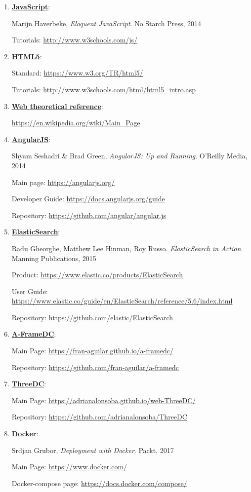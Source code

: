 \documentclass[a4paper, 12pt]{book}
\begin{document}
\begin{enumerate}
\item \underline{\textbf{JavaScript}}:

 Marijn Haverbeke, \textit{Eloquent JavaScript}. No Starch Press, 2014

Tutorials: \url{http://www.w3schools.com/js/}

\item \underline{\textbf{HTML5}}:

Standard: \url{https://www.w3.org/TR/html5/}

Tutorials: \url{http://www.w3schools.com/html/html5_intro.asp}

\item \underline{\textbf{Web theoretical reference}}: 

\url{https://en.wikipedia.org/wiki/Main_Page}

\item \underline{\textbf{AngularJS}}:

 Shyam Seshadri & Brad Green, \textit{AngularJS: Up and Running}. O'Reilly Media, 2014

Main page: \url{https://angularjs.org/}

Developer Guide: \url{https://docs.angularjs.org/guide}

Repository: \url{https://github.com/angular/angular.js}

\item \underline{\textbf{ElasticSearch}}: 

 Radu Gheorghe, Matthew Lee Hinman, Roy Russo. \textit{ElasticSearch in Action}. Manning Publications, 2015

Product: \url{https://www.elastic.co/products/ElasticSearch}

User Guide: \url{https://www.elastic.co/guide/en/ElasticSearch/reference/5.6/index.html}

Repository: \url{https://github.com/elastic/ElasticSearch}

\item \underline{\textbf{A-FrameDC}}:

Main Page: \url{https://fran-aguilar.github.io/a-framedc/}

Repository: \url{https://github.com/fran-aguilar/a-framedc}

\item \underline{\textbf{ThreeDC}}:

Main Page: \url{https://adrianalonsoba.github.io/web-ThreeDC/}

Repository: \url{https://github.com/adrianalonsoba/ThreeDC}

\item \underline{\textbf{Docker}}:

Srdjan Grubor, \textit{Deployment with Docker}. Packt, 2017

Main Page: \url{https://www.docker.com/}

Docker-compose page: \url{https://docs.docker.com/compose/}

\end{enumerate}
\end{document}
